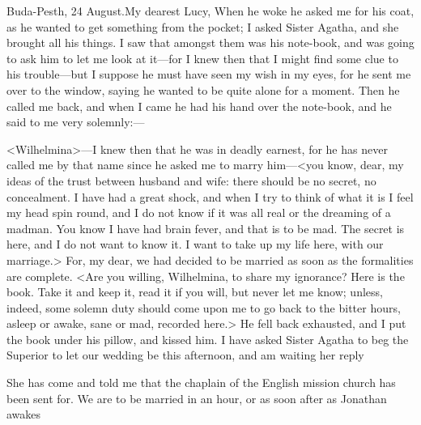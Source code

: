 \begin{mail}{Buda-Pesth, 24 August.}{My dearest Lucy,}
When he woke he asked me for his coat, as he wanted to get something from the pocket; I asked Sister Agatha, and she brought all his things. I saw that amongst them was his note-book, and was going to ask him to let me look at it—for I knew then that I might find some clue to his trouble—but I suppose he must have seen my wish in my eyes, for he sent me over to the window, saying he wanted to be quite alone for a moment. Then he called me back, and when I came he had his hand over the note-book, and he said to me very solemnly:—

<Wilhelmina>—I knew then that he was in deadly earnest, for he has never called me by that name since he asked me to marry him—<you know, dear, my ideas of the trust between husband and wife: there should be no secret, no concealment. I have had a great shock, and when I try to think of what it is I feel my head spin round, and I do not know if it was all real or the dreaming of a madman. You know I have had brain fever, and that is to be mad. The secret is here, and I do not want to know it. I want to take up my life here, with our marriage.> For, my dear, we had decided to be married as soon as the formalities are complete. <Are you willing, Wilhelmina, to share my ignorance? Here is the book. Take it and keep it, read it if you will, but never let me know; unless, indeed, some solemn duty should come upon me to go back to the bitter hours, asleep or awake, sane or mad, recorded here.> He fell back exhausted, and I put the book under his pillow, and kissed him. I have asked Sister Agatha to beg the Superior to let our wedding be this afternoon, and am waiting her reply

 
She has come and told me that the chaplain of the English mission church has been sent for. We are to be married in an hour, or as soon after as Jonathan awakes


\end{mail}
